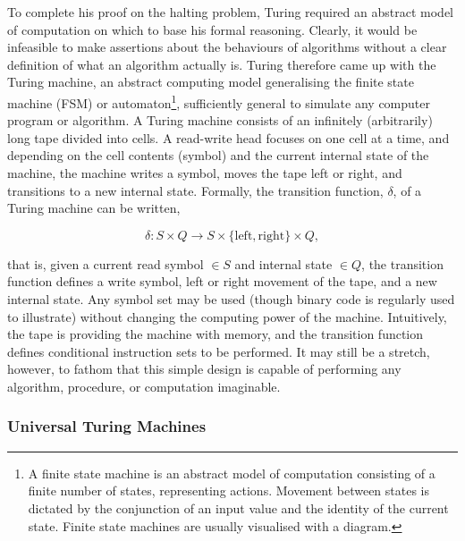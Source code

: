 \documentclass[11pt]{amsart}
\begin{document}
To complete his proof on the halting problem, Turing required an abstract model of computation on which to base his formal reasoning. Clearly, it would be infeasible to make assertions about the behaviours of algorithms without a clear definition of what an algorithm actually is. Turing therefore came up with the Turing machine, an abstract computing model generalising the finite state machine (FSM) or automaton\footnote{A finite state machine is an abstract model of computation consisting of a finite number of states, representing actions. Movement between states is dictated by the conjunction of an input value and the identity of the current state. Finite state machines are usually visualised with a diagram.}, sufficiently general to simulate any computer program or algorithm. A Turing machine consists of an infinitely (arbitrarily) long tape divided into cells. A read-write head focuses on one cell at a time, and depending on the cell contents (symbol) and the current internal state of the machine, the machine writes a symbol, moves the tape left or right, and transitions to a new internal state. Formally, the transition function, $\delta$, of a Turing machine can be written,

$$\delta : S \times Q \to S \times \{\text{left}, \text{right}\} \times Q,$$

that is, given a current read symbol $\in S$ and internal state $\in Q$, the transition function defines a write symbol, left or right movement of the tape, and a new internal state. Any symbol set may be used (though binary code is regularly used to illustrate) without changing the computing power of the machine. Intuitively, the tape is providing the machine with memory, and the transition function defines conditional instruction sets to be performed. It may still be a stretch, however, to fathom that this simple design is capable of performing any algorithm, procedure, or computation imaginable.

\subsubsection{Universal Turing Machines}
\end{document}
